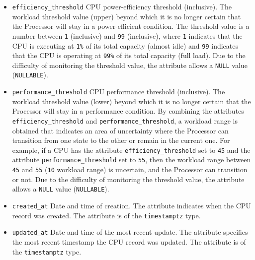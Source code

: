 \begin{itemize}
  \item \texttt{efficiency\_threshold}
    \newline
    CPU power-efficiency threshold (inclusive).
    \newline
    The workload threshold value (upper) beyond which it is no longer certain that
    the Processor will stay in a power-efficient condition.
    \newline
    The threshold value is a number between \texttt{1} (inclusive) and \texttt{99}
    (inclusive), where \texttt{1} indicates that the CPU is executing at \texttt{1\%}
    of its total capacity (almost idle) and \texttt{99} indicates that the CPU is
    operating at \texttt{99\%} of its total capacity (full load).
    \newline
    Due to the difficulty of monitoring the threshold value, the attribute allows
    a \texttt{NULL} value (\texttt{NULLABLE}).

  \item \texttt{performance\_threshold}
    \newline
    CPU performance threshold (inclusive).
    \newline
    The workload threshold value (lower) beyond which it is no longer certain that
    the Processor will stay in a performance condition.
    \newline
    By combining the attributes \texttt{efficiency\_threshold} and \texttt{performance\_threshold},
    a workload range is obtained that indicates an area of uncertainty where the
    Processor can transition from one state to the other or remain in the current
    one. For example, if a CPU has the attribute \texttt{efficiency\_threshold}
    set to \texttt{45} and the attribute \texttt{performance\_threshold} set to
    \texttt{55}, then the workload range between \texttt{45} and \texttt{55} (\texttt{10}
    workload range) is uncertain, and the Processor can transition or not.
    \newline
    Due to the difficulty of monitoring the threshold value, the attribute
    allows a \texttt{NULL} value (\texttt{NULLABLE}).

  \item \texttt{created\_at}
    \newline
    Date and time of creation.
    \newline
    The attribute indicates when the CPU record was created.
    \newline
    The attribute is of the \texttt{timestamptz} type.

  \item \texttt{updated\_at}
    \newline
    Date and time of the most recent update.
    \newline
    The attribute specifies the most recent timestamp the CPU record was updated.
    \newline
    The attribute is of the \texttt{timestamptz} type.
\end{itemize}

